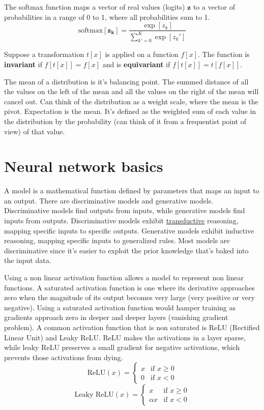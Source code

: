 \documentclass{article}
\begin{document}
The softmax function maps a vector of real values (logits) $\mathbf{z}$ to a vector of probabilities in a range of 0 to 1, where all probabilities sum to 1.
\[ \text{softmax}[\mathbf{z_k}] = \frac{\exp[z_k]}{\sum_{k' = 0}^{K} \exp[z_k']} \]

Suppose a transformation $t[x]$ is applied on a function $f[x]$. The function is \textbf{invariant} if $f[t[x]] = f[x]$ and is \textbf{equivariant} if $f[t[x]] = t[f[x]]$.

The mean of a distribution is it's balancing point. The summed distance of all the values on the left of the mean and all the values on the right of the mean will cancel out. Can think of the distribution as a weight scale, where the mean is the pivot. Expectation is the mean. It's defined as the weighted sum of each value in the distribution by the probability (can think of it from a frequentist point of view) of that value.

\section{Neural network basics}
A model is a mathematical function defined by parameters that maps an input to an output. There are discriminative models and generative models. Discriminative models find outputs from inputs, while generative models find inputs from outputs. Discriminative models exhibit \href{https://en.wikipedia.org/wiki/Transduction_(machine_learning)}{transductive} reasoning, mapping specific inputs to specific outputs. Generative models exhibit inductive reasoning, mapping specific inputs to generalized rules. Most models are discriminative since it's easier to exploit the prior knowledge that's baked into the input data.

Using a non linear activation function allows a model to represent non linear functions. A saturated activation function is one where its derivative approaches zero when the magnitude of its output becomes very large (very positive or very negative). Using a saturated activation function would hamper training as gradients approach zero in deeper and deeper layers (vanishing gradient problem). A common activation function that is non saturated is ReLU (Rectified Linear Unit) and Leaky ReLU. ReLU makes the activations in a layer sparse, while leaky ReLU preserves a small gradient for negative activations, which prevents those activations from dying.
\[ \text{ReLU}(x) = \begin{cases} x & \text{if } x \geq 0 \\ 0 & \text{if } x < 0 \end{cases} \]
\[ \text{Leaky ReLU}(x) = \begin{cases} x & \text{if } x \geq 0 \\ \alpha x & \text{if } x < 0 \end{cases} \]
\end{document}

